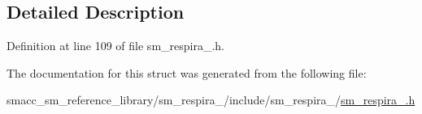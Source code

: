 \subsection{Detailed Description}


Definition at line 109 of file sm\+\_\+respira\+\_.\+h.



The documentation for this struct was generated from the following file\+:\begin{DoxyCompactItemize}
\item 
smacc\+\_\+sm\+\_\+reference\+\_\+library/sm\+\_\+respira\+\_/include/sm\+\_\+respira\+\_/\hyperlink{sm__respira__1_8h}{sm\+\_\+respira\+\_.\+h}\end{DoxyCompactItemize}
